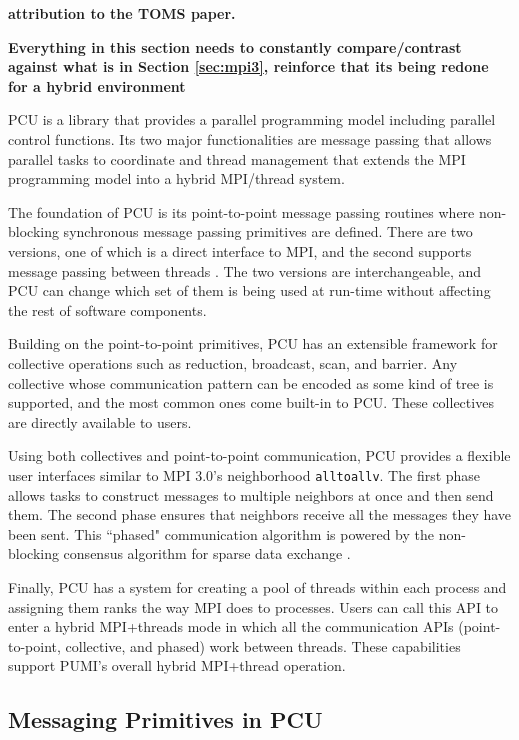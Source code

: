 {\bf attribution to the TOMS paper.}

{\bf Everything in this section needs to constantly
compare/contrast against what is in Section \ref{sec:mpi3},
reinforce that its being redone for a hybrid environment}

PCU is a library that provides a parallel programming model including
parallel control functions.
Its two major functionalities are message passing that allows parallel tasks to
coordinate and thread management that extends the MPI programming model
into a hybrid MPI/thread system.

The foundation of PCU is its point-to-point message passing routines where
non-blocking synchronous message passing primitives are defined. There are
two versions, one of which is a direct interface to MPI, and the second supports
message passing between threads \cite{ibanez2014hybrid}. The two versions
are interchangeable, and PCU can change which set of them is being used at
run-time without affecting the rest of software components.

Building on the point-to-point primitives, PCU has an extensible framework for
collective operations such as reduction, broadcast, scan, and barrier.
Any collective whose communication pattern can be encoded as some kind of tree
is supported, and the most common ones come built-in to PCU.
These collectives are directly available to users.

Using both collectives and point-to-point communication, PCU provides a flexible
user interfaces similar to MPI 3.0's neighborhood \texttt{alltoallv}.
The first phase
allows tasks to construct messages to multiple neighbors
at once and then send them.
The second phase ensures that neighbors
receive all the messages they have been sent.
This ``phased" communication algorithm is
powered by the non-blocking consensus algorithm
for sparse data exchange \cite{hoefler2010scalable}.

Finally, PCU has a system for creating a pool of threads within each process and
assigning them ranks the way MPI does to processes.
Users can call this API to enter a hybrid MPI+threads mode in which all the
communication APIs (point-to-point, collective, and phased) work between
threads.
These capabilities support PUMI's overall hybrid MPI+thread operation.

\subsection{Messaging Primitives in PCU}
\label{sec:pcu_p2p}

